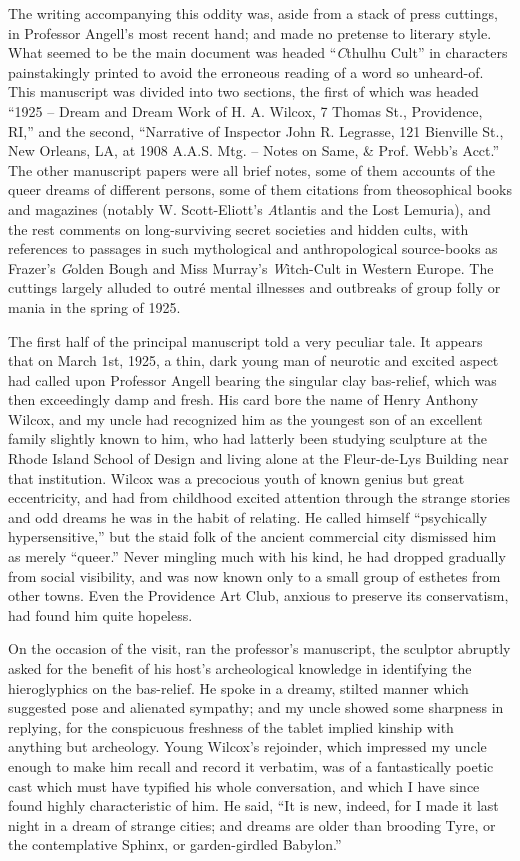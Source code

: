 The writing accompanying this oddity was, aside from a stack of press cuttings, in Professor Angell’s most recent hand; and made no pretense to literary style. What seemed to be the main document was headed “{\emph Cthulhu Cult}” in characters painstakingly printed to avoid the erroneous reading of a word so unheard-of. This manuscript was divided into two sections, the first of which was headed “1925⁠ – Dream and Dream Work of H. A. Wilcox, 7 Thomas St., Providence, RI,” and the second, “Narrative of Inspector John R. Legrasse, 121 Bienville St., New Orleans, LA, at 1908 A.A.S. Mtg.⁠ – Notes on Same, \& Prof. Webb’s Acct.” The other manuscript papers were all brief notes, some of them accounts of the queer dreams of different persons, some of them citations from theosophical books and magazines (notably W. Scott-Eliott’s {\emph Atlantis and the Lost Lemuria}), and the rest comments on long-surviving secret societies and hidden cults, with references to passages in such mythological and anthropological source-books as Frazer’s {\emph Golden Bough} and Miss Murray’s {\emph Witch-Cult in Western Europe}. The cuttings largely alluded to outré mental illnesses and outbreaks of group folly or mania in the spring of 1925.

\sectionbreak

The first half of the principal manuscript told a very peculiar tale. It appears that on March 1st, 1925, a thin, dark young man of neurotic and excited aspect had called upon Professor Angell bearing the singular clay bas-relief, which was then exceedingly damp and fresh. His card bore the name of Henry Anthony Wilcox, and my uncle had recognized him as the youngest son of an excellent family slightly known to him, who had latterly been studying sculpture at the Rhode Island School of Design and living alone at the Fleur-de-Lys Building near that institution. Wilcox was a precocious youth of known genius but great eccentricity, and had from childhood excited attention through the strange stories and odd dreams he was in the habit of relating. He called himself “psychically hypersensitive,” but the staid folk of the ancient commercial city dismissed him as merely “queer.” Never mingling much with his kind, he had dropped gradually from social visibility, and was now known only to a small group of esthetes from other towns. Even the Providence Art Club, anxious to preserve its conservatism, had found him quite hopeless.

On the occasion of the visit, ran the professor’s manu\-script, the sculptor abruptly asked for the benefit of his host’s archeological knowledge in identifying the hieroglyphics on the bas-relief. He spoke in a dreamy, stilted manner which suggested pose and alienated sympathy; and my uncle showed some sharpness in replying, for the conspicuous freshness of the tablet implied kinship with anything but archeology. Young Wilcox’s rejoinder, which impressed my uncle enough to make him recall and record it verbatim, was of a fantastically poetic cast which must have typified his whole conversation, and which I have since found highly characteristic of him. He said, “It is new, indeed, for I made it last night in a dream of strange cities; and dreams are older than brooding Tyre, or the contemplative Sphinx, or garden-girdled Babylon.”


